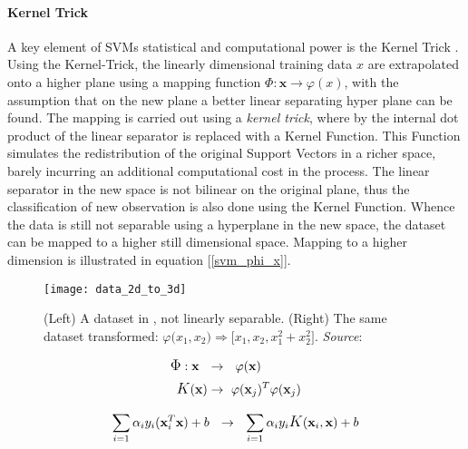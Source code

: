 	\par		
	\paragraph{Kernel Trick}
	A key element of SVMs statistical and computational power is the Kernel Trick \cite{guyon1993automatic}. Using the Kernel-Trick, the linearly dimensional training data $x$ are extrapolated onto a higher plane using a mapping function $\Phi:\textbf{x} \rightarrow \varphi(x)$, with the assumption that on the new plane a better linear separating hyper plane can be found. The mapping is carried out using a \textit{kernel trick}, where by the internal dot product of the linear separator is replaced with a Kernel Function. This Function simulates the redistribution of the original Support Vectors in a richer space, barely incurring an additional computational cost in the process. The linear separator in the new space is not bilinear on the original plane, thus the classification of new observation is also done using the Kernel Function. Whence the data is still not separable using a hyperplane in the new space, the dataset can be mapped to a higher still dimensional space. Mapping to a higher dimension is illustrated in equation [\ref{svm_phi_x}].
	
	\begin{figure}[h]
		\centering
		\captionsetup{width=0.8\textwidth}
		\texttt{[image: data\_2d\_to\_3d]}
		\caption[SVM Dimensionianl Extrapolation]{
			\footnotesize{
				(Left) A dataset in  , not linearly separable. (Right) The same dataset transformed:
				$\varphi \big(x_1, x_2\big) \Rightarrow \big[ x_1,x_2,x_1^2+x_2^2 \big]$.
				\textit{Source}:\cite{kimso}
			}
		}
	\end{figure}

	\begin{equation}
		\begin{aligned}
			\mathlarger{\Phi}: \textbf{x} \ \ &\rightarrow \ \  \varphi(\textbf{x}) \\
			\mathlarger{K}(\textbf{x}) &\rightarrow \ \varphi(\textbf{x}_j)^T \varphi(\textbf{x}_j)
		\end{aligned}
		\label{svm_phi_x}
	\end{equation}
	
	\begin{equation}
		\sum_{i=1} \alpha_i y_i (\textbf{x}_i^T \textbf{x}) + b  \ \  \rightarrow \ \ 
		\sum_{i=1} \alpha_i y_i \mathlarger{K}(\textbf{x}_i, \textbf{x}) + b
		\label{svm_insert_kernel}
	\end{equation}
	
